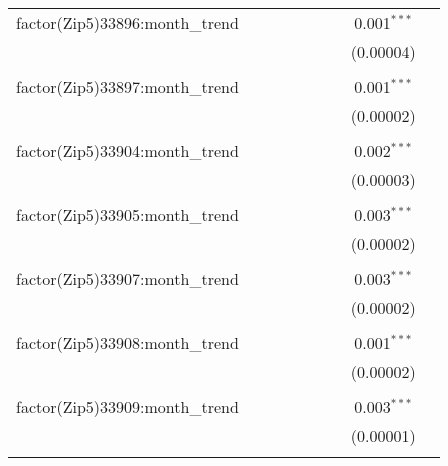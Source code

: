 \begin{table}[H]
{\begin{tabular}{@{\extracolsep{5pt}}lcccccccc}
  factor(Zip5)33896:month\_trend &  &  &  &  &  &  & 0.001$^{***}$ &  \\  

   &  &  &  &  &  &  & (0.00004) &  \\  

   & & & & & & & & \\  

  factor(Zip5)33897:month\_trend &  &  &  &  &  &  & 0.001$^{***}$ &  \\  

   &  &  &  &  &  &  & (0.00002) &  \\  

   & & & & & & & & \\  

  factor(Zip5)33904:month\_trend &  &  &  &  &  &  & 0.002$^{***}$ &  \\  

   &  &  &  &  &  &  & (0.00003) &  \\  

   & & & & & & & & \\  

  factor(Zip5)33905:month\_trend &  &  &  &  &  &  & 0.003$^{***}$ &  \\  

   &  &  &  &  &  &  & (0.00002) &  \\  

   & & & & & & & & \\  

  factor(Zip5)33907:month\_trend &  &  &  &  &  &  & 0.003$^{***}$ &  \\  

   &  &  &  &  &  &  & (0.00002) &  \\  

   & & & & & & & & \\  

  factor(Zip5)33908:month\_trend &  &  &  &  &  &  & 0.001$^{***}$ &  \\  

   &  &  &  &  &  &  & (0.00002) &  \\  

   & & & & & & & & \\  

  factor(Zip5)33909:month\_trend &  &  &  &  &  &  & 0.003$^{***}$ &  \\  

   &  &  &  &  &  &  & (0.00001) &  \\  

   & & & & & & & & \\  


\end{tabular}}
\end{table}
